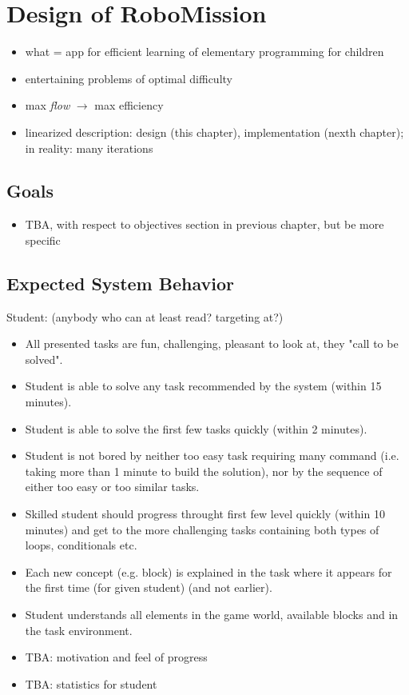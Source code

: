\chapter{Design of RoboMission}
\label{chap:design-of-robomission}

\begin{itemize}
\item what = app for efficient learning of elementary programming for children
\item entertaining problems of optimal difficulty
\item max \emph{flow} $\rightarrow$ max efficiency
\item linearized description: design (this chapter), implementation (nexth chapter); in reality: many iterations
\end{itemize}




\section{Goals}
\label{sec:robomission.goals}

\begin{itemize}
\item TBA, with respect to objectives section in previous chapter, but be more specific
\end{itemize}


\section{Expected System Behavior}
\label{sec:robomission.behavior}

Student: (anybody who can at least read? targeting at?)
\begin{itemize}
\item All presented tasks are fun, challenging, pleasant to look at, they "call to be solved".
\item Student is able to solve any task recommended by the system (within 15 minutes).
\item Student is able to solve the first few tasks quickly (within 2 minutes).
\item Student is not bored by neither too easy task requiring many command (i.e. taking more than 1 minute to build the solution), nor by the sequence of either too easy or too similar tasks.
\item Skilled student should progress throught first few level quickly (within 10 minutes) and get to the more challenging tasks containing both types of loops, conditionals etc.
\item Each new concept (e.g. block) is explained in the task where it appears for the first time (for given student) (and not earlier).
\item Student understands all elements in the game world, available blocks and in the task environment.
\item TBA: motivation and feel of progress
\item TBA: statistics for student
\end{itemize}

